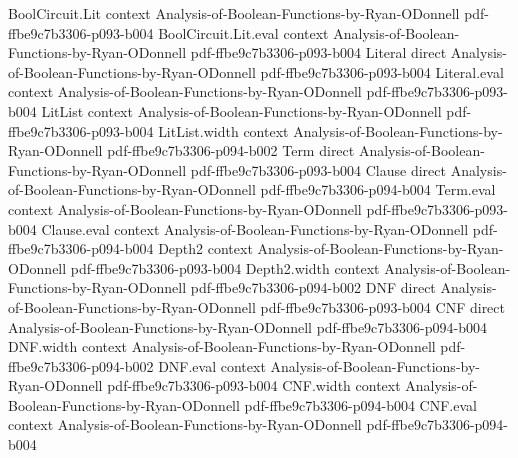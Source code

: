 \begin{lemma}
\leanok
{}
\proofstep
  {BoolCircuit.Lit}
  {context}
  {Analysis-of-Boolean-Functions-by-Ryan-ODonnell}
  {pdf-ffbe9c7b3306-p093-b004}
\proofstep
  {BoolCircuit.Lit.eval}
  {context}
  {Analysis-of-Boolean-Functions-by-Ryan-ODonnell}
  {pdf-ffbe9c7b3306-p093-b004}
\proofstep
  {Literal}
  {direct}
  {Analysis-of-Boolean-Functions-by-Ryan-ODonnell}
  {pdf-ffbe9c7b3306-p093-b004}
\proofstep
  {Literal.eval}
  {context}
  {Analysis-of-Boolean-Functions-by-Ryan-ODonnell}
  {pdf-ffbe9c7b3306-p093-b004}
\proofstep
  {LitList}
  {context}
  {Analysis-of-Boolean-Functions-by-Ryan-ODonnell}
  {pdf-ffbe9c7b3306-p093-b004}
\proofstep
  {LitList.width}
  {context}
  {Analysis-of-Boolean-Functions-by-Ryan-ODonnell}
  {pdf-ffbe9c7b3306-p094-b002}
\proofstep
  {Term}
  {direct}
  {Analysis-of-Boolean-Functions-by-Ryan-ODonnell}
  {pdf-ffbe9c7b3306-p093-b004}
\proofstep
  {Clause}
  {direct}
  {Analysis-of-Boolean-Functions-by-Ryan-ODonnell}
  {pdf-ffbe9c7b3306-p094-b004}
\proofstep
  {Term.eval}
  {context}
  {Analysis-of-Boolean-Functions-by-Ryan-ODonnell}
  {pdf-ffbe9c7b3306-p093-b004}
\proofstep
  {Clause.eval}
  {context}
  {Analysis-of-Boolean-Functions-by-Ryan-ODonnell}
  {pdf-ffbe9c7b3306-p094-b004}
\proofstep
  {Depth2}
  {context}
  {Analysis-of-Boolean-Functions-by-Ryan-ODonnell}
  {pdf-ffbe9c7b3306-p093-b004}
\proofstep
  {Depth2.width}
  {context}
  {Analysis-of-Boolean-Functions-by-Ryan-ODonnell}
  {pdf-ffbe9c7b3306-p094-b002}
\proofstep
  {DNF}
  {direct}
  {Analysis-of-Boolean-Functions-by-Ryan-ODonnell}
  {pdf-ffbe9c7b3306-p093-b004}
\proofstep
  {CNF}
  {direct}
  {Analysis-of-Boolean-Functions-by-Ryan-ODonnell}
  {pdf-ffbe9c7b3306-p094-b004}
\proofstep
  {DNF.width}
  {context}
  {Analysis-of-Boolean-Functions-by-Ryan-ODonnell}
  {pdf-ffbe9c7b3306-p094-b002}
\proofstep
  {DNF.eval}
  {context}
  {Analysis-of-Boolean-Functions-by-Ryan-ODonnell}
  {pdf-ffbe9c7b3306-p093-b004}
\proofstep
  {CNF.width}
  {context}
  {Analysis-of-Boolean-Functions-by-Ryan-ODonnell}
  {pdf-ffbe9c7b3306-p094-b004}
\proofstep
  {CNF.eval}
  {context}
  {Analysis-of-Boolean-Functions-by-Ryan-ODonnell}
  {pdf-ffbe9c7b3306-p094-b004}
\proofstep

\end{lemma}

